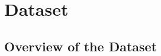 \documentclass{article}
\begin{document}

    

\clearpage
\section{Dataset}
\label{appendix:dataset}

\subsection{Overview of the Dataset}
\end{document}
